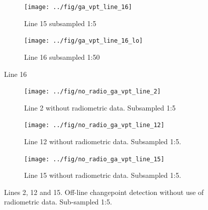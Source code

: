 \begin{figure}
	\centering
	\begin{subfigure}[b]{1\textwidth}
	\centering
	\texttt{[image: ../fig/ga\_vpt\_line\_16]}
	\caption[Line 16]{Line 15 subsampled 1:5 }
	\label{fig:galine16}
	\end{subfigure}
	
	\begin{subfigure}[b]{1\textwidth}
	\centering
	\texttt{[image: ../fig/ga\_vpt\_line\_16\_lo]}
	\caption[Line 16]{Line 16 subsampled 1:50 }
	\label{fig:galine16_lo}
	\end{subfigure}
	
	\caption[Line 16]{Line 16}
\end{figure}

\begin{figure}
	\centering
	\begin{subfigure}[b]{1\textwidth}
		\centering
		\texttt{[image: ../fig/no\_radio\_ga\_vpt\_line\_2]}
		\caption[Line 2, no radometry]{Line 2 without radiometric data. Subsampled 1:5 }
	\label{fig:galine2_no}
\end{subfigure}
	
	\begin{subfigure}[b]{1\textwidth}
		\centering
		\texttt{[image: ../fig/no\_radio\_ga\_vpt\_line\_12]}
		\caption[Line 12, no radometry]{Line 12 without radiometric data. Subsampled 1:5. }
	\label{fig:galine12_no}
\end{subfigure}
	
	\begin{subfigure}[b]{1\textwidth}
			\centering
			\texttt{[image: ../fig/no\_radio\_ga\_vpt\_line\_15]}
			\caption[Line 15, no radometry]{Line 15 without radiometric data. Subsampled 1:5. }
			\label{fig:galine15_no}
\end{subfigure}
		
	\caption[Line 2, 12 and 15 without radometry]{Lines 2, 12 and 15. Off-line changepoint detection without use of radiometric data. Sub-sampled 1:5.}
\end{figure}

